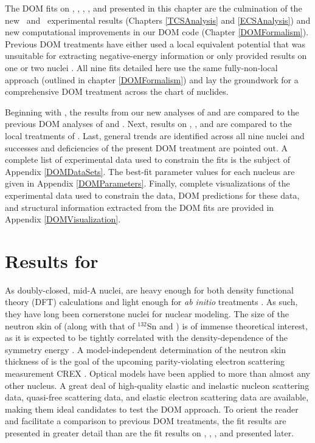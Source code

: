The DOM fits on \oSixEight, \caAughtEight, \niEightFour, \snTwelveFour, and \pbEight presented in
this chapter are the culmination of the new \tot\ and \el\ experimental results
(Chapters \ref{TCSAnalysis} and \ref{ECSAnalysis})
and new computational improvements in our DOM code (Chapter \ref{DOMFormalism}).
Previous DOM treatments have either used a
local equivalent potential \cite{Charity2006, Mueller2011} that was unsuitable for extracting
negative-energy information or only provided results on one or
two nuclei \cite{Mahzoon2017}. All nine fits detailed here use the same fully-non-local approach
(outlined in chapter \ref{DOMFormalism}) and lay the groundwork for a comprehensive DOM treatment 
across the chart of nuclides.

Beginning with \caForty, the results from our new analyses of
\caAughtEight and \pbEight are compared to the previous DOM analyses of \cite{MahzoonPhDThesis} and 
\cite{Atkinson2018}. Next, results on \oSixEight, \niEightFour, and \snTwelveFour are compared to
the local treatments of \cite{Charity2006, Mueller2011}. Last, general trends are identified across
all nine nuclei and successes and deficiencies of the present DOM treatment are pointed out.
A complete list of experimental data used to constrain the fits is the subject of Appendix
\ref{DOMDataSets}. The best-fit parameter values for each nucleus are given in Appendix
\ref{DOMParameters}. Finally, complete visualizations of the experimental data used to constrain
the data, DOM predictions for these data, and structural information extracted from the DOM fits are
provided in Appendix \ref{DOMVisualization}.

\section{Results for \caAughtEight}
As doubly-closed, mid-A nuclei, \caAughtEight are heavy enough for both density functional
theory (DFT) calculations \cite{Piekarewicz2012} and light enough for \textit{ab initio} 
treatments \cite{Hagen2016}. As such, they have long been cornerstone nuclei for
nuclear modeling. The size of the neutron skin of \caEight (along with that of $^{132}$Sn and
\pbEight) is of immense theoretical interest, as it is expected to be tightly correlated with the
density-dependence of the symmetry energy \cite{Fattoyev2012}. A model-independent determination
of the neutron skin thickness of \caEight is the goal of the upcoming parity-violating
electron scattering measurement CREX \cite{CREX}. Optical models have been applied to
\caAughtEight more than almost any other nucleus. A great deal of high-quality \caAughtEight elastic 
and inelastic nucleon scattering data, quasi-free scattering data, and elastic electron
scattering data are available, making them ideal candidates to test the DOM approach. To orient the
reader and facilitate a comparison to previous DOM treatments, the \caAughtEight fit results are
presented in greater detail than are the fit results on \oSixEight, \niEightFour,
\snTwelveFour, and \pbEight presented later.

